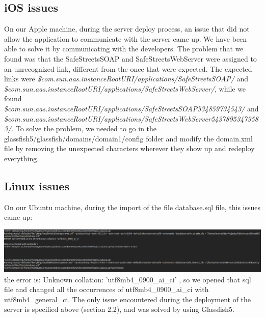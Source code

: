 \documentclass[../ATD.tex]{subfiles}
\begin{document}
    \subsection{iOS issues}\label{subsec:ios-issues}
    On our Apple machine,
    during the server deploy process, an issue that did not allow the application to communicate with the server came up.
    We have been able to solve it by communicating with the developers.
    The problem that we found was that the SafeStreetsSOAP and SafeStreetsWebServer were assigned to an unrecognized link, different from the once that were expected.
    The expected links were \textit{\${com.sun.aas.instanceRootURI}/applications/SafeStreetsSOAP/} and \textit{\${com.sun.aas.instanceRootURI}/applications/SafeStreetsWebServer/},
    while we found \textit{\${com.sun.aas.instanceRootURI}/applications/SafeStreetsSOAP534859734543/} and \newline\textit{\${com.sun.aas.instanceRootURI}/applications/SafeStreetsWebServer54378953479583/}.
    \newline To solve the problem, we needed to go in the glassfish5/glassfish/domains/domain1/config folder and modify the domain.xml file by removing the unexpected characters wherever they show up and
    redeploy everything.

    \subsection{Linux issues}\label{subsec:linux-issues}
    On our Ubuntu machine,
    during the import of the file database.sql file, this issues came up:

    \includegraphics[scale = 0.3]{assets/errorDb.png}
    the error is: Unknown collation: 'utf8mb4\_0900\_ai\_ci' ,
    so we opened that sql file and changed all the occurrences of utf8mb4\_0900\_ai\_ci with utf8mb4\_general\_ci. \newline
    The only issue encountered during the deployment of the server is specified above (section 2.2), and was solved by using Glassfish5.
\end{document}
